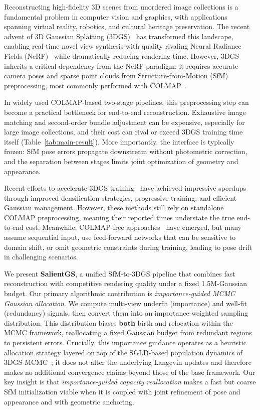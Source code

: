 \documentclass[sigconf]{acmart}
\begin{document}
Reconstructing high-fidelity 3D scenes from unordered image collections is a fundamental problem in computer vision and graphics, with applications spanning virtual reality, robotics, and cultural heritage preservation. The recent advent of 3D Gaussian Splatting (3DGS)~\cite{kerbl3Dgaussians} has transformed this landscape, enabling real-time novel view synthesis with quality rivaling Neural Radiance Fields (NeRF)~\cite{mildenhall2021nerf} while dramatically reducing rendering time. However, 3DGS inherits a critical dependency from the NeRF paradigm: it requires accurate camera poses and sparse point clouds from Structure-from-Motion (SfM) preprocessing, most commonly performed with COLMAP~\cite{colmap}.

In widely used COLMAP-based two-stage pipelines, this preprocessing step can become a practical bottleneck for end-to-end reconstruction. Exhaustive image matching and second-order bundle adjustment can be expensive, especially for large image collections, and their cost can rival or exceed 3DGS training time itself (Table~\ref{tab:main-result}). More importantly, the interface is typically frozen: SfM pose errors propagate downstream without photometric correction, and the separation between stages limits joint optimization of geometry and appearance.

Recent efforts to accelerate 3DGS training~\cite{mallick2024taming,chen2025dashgaussian,fang2024mini,ren2025fastgs} have achieved impressive speedups through improved densification strategies, progressive training, and efficient Gaussian management. However, these methods still rely on standalone COLMAP preprocessing, meaning their reported times understate the true end-to-end cost. Meanwhile, COLMAP-free approaches~\cite{fu2024colmap,ji2025sfm,huang20253r} have emerged, but many assume sequential input, use feed-forward networks that can be sensitive to domain shift, or omit geometric constraints during training, leading to pose drift in challenging scenarios.

We present \textbf{SalientGS}, a unified SfM-to-3DGS pipeline that combines fast reconstruction with competitive rendering quality under a fixed 1.5M-Gaussian budget. Our primary algorithmic contribution is \emph{importance-guided MCMC Gaussian allocation}. We compute multi-view underfit (importance) and well-fit (redundancy) signals, then convert them into an importance-weighted sampling distribution. This distribution biases \textbf{both} birth and relocation within the MCMC framework, reallocating a fixed Gaussian budget from redundant regions to persistent errors. Crucially, this importance guidance operates as a heuristic allocation strategy layered on top of the SGLD-based population dynamics of 3DGS-MCMC~\cite{mcmc3dgs}; it does not alter the underlying Langevin updates and therefore makes no additional convergence claims beyond those of the base framework. Our key insight is that \emph{importance-guided capacity reallocation} makes a fast but coarse SfM initialization viable when it is coupled with joint refinement of pose and appearance and with geometric anchoring.
\end{document}

